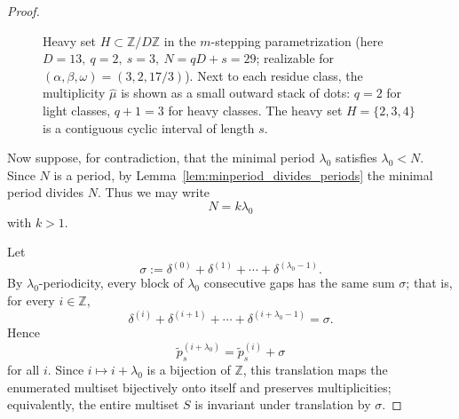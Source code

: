 \documentclass[11pt,reqno]{amsart}
\theoremstyle{plain}
\theoremstyle{definition}
\theoremstyle{remark}
\begin{document}
\begin{proof}
\begin{figure}[ht]
\centering
{}
\caption{Heavy set \(H\subset\mathbb{Z}/D\mathbb{Z}\) in the
\(m\)-stepping parametrization
(here \(D=13,\ q=2,\ s=3,\ N=qD+s=29\); realizable for
\((\alpha,\beta,\omega)=(3,2,17/3)\)).
Next to each residue class, the multiplicity \(\hat{\mu}\) is shown as a
small outward stack of dots: \(q=2\) for light classes, \(q+1=3\) for heavy
classes.  The heavy set \(H=\{2,3,4\}\) is a contiguous cyclic
interval of length \(s\).}
\label{fig:heavy-set}
\end{figure}

Now suppose, for contradiction, that the minimal period \(\lambda_0\) satisfies
\(\lambda_0 < N\).  Since \(N\) is a period, by
Lemma~\ref{lem:minperiod_divides_periods} the minimal period divides
\(N\).  Thus we may write
\[
    N = k\lambda_0
\]
with \(k>1\).

Let
\[
    \sigma := \delta^{(0)} + \delta^{(1)} + \cdots + \delta^{(\lambda_0-1)}.
\]
By \(\lambda_0\)-periodicity, every block of \(\lambda_0\) consecutive
gaps has the same sum \(\sigma\); that is, for every
\(i \in \mathbb{Z}\),
\[
    \delta^{(i)} + \delta^{(i+1)} + \cdots + \delta^{(i+\lambda_0-1)}
    = \sigma.
\]
Hence
\[
    \tilde{p}_s^{(i+\lambda_0)} = \tilde{p}_s^{(i)} + \sigma
\]
for all \(i\).  Since \(i \mapsto i+\lambda_0\) is a bijection of
\(\mathbb{Z}\), this translation maps the enumerated multiset
bijectively onto itself and preserves multiplicities; equivalently,
the entire multiset \(S\) is invariant under translation
by \(\sigma\).


\end{proof}
\end{document}
